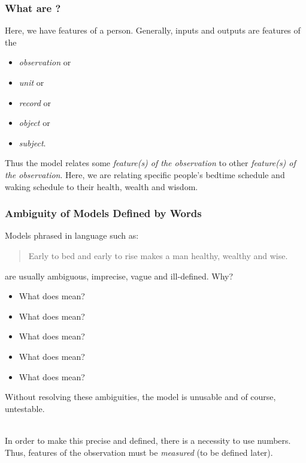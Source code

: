 \documentclass[slides]{beamer} %
\begin{document}
\begin{frame}\frametitle{What are ?}

Here, we have features of a person. Generally, inputs and outputs are features of the 

\begin{itemize}
\item \textit{observation} or 
\item \textit{unit} or 
\item \textit{record} or 
\item \textit{object} or 
\item \textit{subject}.
\end{itemize} 


Thus the model relates some \textit{feature(s) of the observation} to other \textit{feature(s) of the observation}. Here, we are relating specific people's bedtime schedule and waking schedule to their health, wealth and wisdom.
\end{frame}






\begin{frame}\frametitle{Ambiguity of Models Defined by Words}

\small
Models phrased in language such as:

\begin{quotation}
Early to bed and early to rise makes a man healthy, wealthy and wise.
\end{quotation}

are usually ambiguous, imprecise, vague and ill-defined. Why? \pause 

\begin{itemize}
\item What does  mean? 
\item What does  mean? 
\item What does  mean? 
\item What does  mean? 
\item What does  mean?
\end{itemize}

Without resolving these ambiguities, \pause the model is unusable and of course, untestable. \\~\\ \pause
\vspace{-0.3cm}

In order to make this precise and defined, there is a necessity to use numbers. \pause Thus, features of the observation must be \textit{measured} (to be defined later). \pause 
	
\end{frame}
\end{document}
